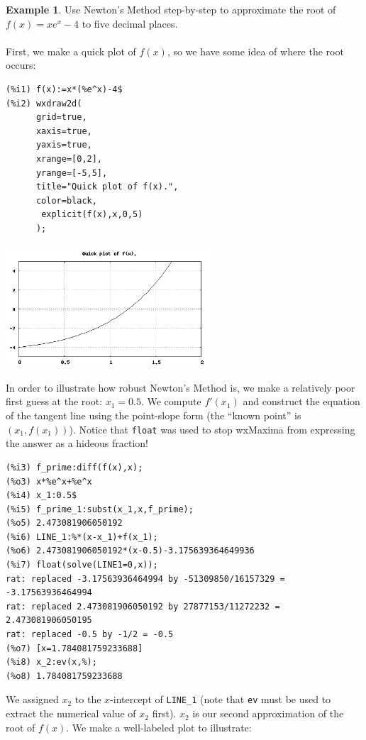\documentclass[10.5pt,twoside]{report}
\theoremstyle{definition}
\newtheorem{exmp}{Example}[section]
\begin{document}
\begin{exmp}  Use Newton's Method step-by-step to approximate the root of $f(x)=xe^x-4$ to five decimal places.\\
${}$\\
First, we make a quick plot of $f(x)$, so we have some idea of where the root occurs:

\begin{verbatim}
(%i1) f(x):=x*(%e^x)-4$
(%i2) wxdraw2d(
      grid=true,
      xaxis=true,
      yaxis=true,
      xrange=[0,2],
      yrange=[-5,5],
      title="Quick plot of f(x).",
      color=black,
       explicit(f(x),x,0,5)
      );
\end{verbatim}

\includegraphics[width=3in]{example_5_4_1_1}

In order to illustrate how robust Newton's Method is, we make a relatively poor first guess at the root:  $x_1=0.5$.  We compute $f'(x_1)$ and construct the equation of the tangent line using the point-slope form (the ``known point'' is $(x_1,f(x_1))$).  Notice that \verb|float| was used to stop wxMaxima from expressing the answer as a hideous fraction!

\begin{verbatim}
(%i3) f_prime:diff(f(x),x);
(%o3) x*%e^x+%e^x
(%i4) x_1:0.5$
(%i5) f_prime_1:subst(x_1,x,f_prime);
(%o5) 2.473081906050192
(%i6) LINE_1:%*(x-x_1)+f(x_1);
(%o6) 2.473081906050192*(x-0.5)-3.175639364649936
(%i7) float(solve(LINE1=0,x));
rat: replaced -3.17563936464994 by -51309850/16157329 = -3.17563936464994
rat: replaced 2.473081906050192 by 27877153/11272232 = 2.473081906050195
rat: replaced -0.5 by -1/2 = -0.5
(%o7) [x=1.784081759233688]
(%i8) x_2:ev(x,%);
(%o8) 1.784081759233688
\end{verbatim}

We assigned $x_2$ to the $x$-intercept of \verb|LINE_1| (note that \verb|ev| must be used to extract the numerical value of $x_2$ first).  $x_2$ is our second approximation of the root of $f(x)$. We make a well-labeled plot to illustrate:\\


\end{exmp}
\end{document}
